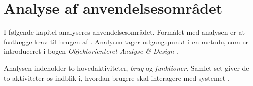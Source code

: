 \chapter{Analyse af anvendelsesområdet}
\label{chap:analyseafao}

I følgende kapitel analyseres anvendelsesområdet. Formålet med analysen er at fastlægge krav til brugen af \Foodl{}. Analysen tager udgangspunkt i en metode, som er introduceret i bogen \emph{Objektorienteret Analyse \& Design} \cite[s. ~113]{ooad}. 

Analysen indeholder to hovedaktiviteter, \textit{brug} og \textit{funktioner}. Samlet set giver de to aktiviteter os indblik i, hvordan brugere skal interagere med systemet %
\cite[s. ~115]{ooad}.




